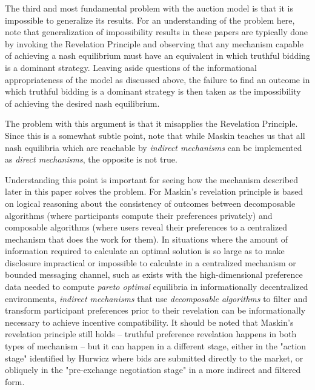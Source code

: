 The third and most fundamental problem with the auction model is that it is impossible to generalize its results. For an understanding of the problem here, note that generalization of impossibility results in these papers are typically done by invoking the Revelation Principle and observing that any mechanism capable of achieving a nash equilibrium must have an equivalent in which truthful bidding is a dominant strategy. Leaving aside questions of the informational appropriateness of the model as discussed above, the failure to find an outcome in which truthful bidding is a dominant strategy is then taken as the impossibility of achieving the desired nash equilibrium.

The problem with this argument is that it misapplies the Revelation Principle. Since this is a somewhat subtle point, note that while Maskin teaches us that all nash equilibria which are reachable by \textit{indirect mechanisms} can be implemented as \textit{direct mechanisms}, the opposite is not true.

Understanding this point is important for seeing how the mechanism described later in this paper solves the problem. For Maskin's revelation principle is based on logical reasoning about the consistency of outcomes between decomposable algorithms (where participants compute their preferences privately) and composable algorithms (where users reveal their preferences to a centralized mechanism that does the work for them). In situations where the amount of information required to calculate an optimal solution is so large as to make disclosure impractical or impossible to calculate in a centralized mechanism or bounded messaging channel, such as exists with the high-dimensional preference data needed to compute \textit{pareto optimal} equilibria in informationally decentralized environments, \textit{indirect mechanisms} that use \textit{decomposable algorithms} to filter and transform participant preferences prior to their revelation can be informationally necessary to achieve incentive compatibility. It should be noted that Maskin's revelation principle still holds -- truthful preference revelation happens in both types of mechanism -- but it can happen in a different stage, either in the "action stage" identified by Hurwicz where bids are submitted directly to the market, or obliquely in the "pre-exchange negotiation stage" in a more indirect and filtered form.

